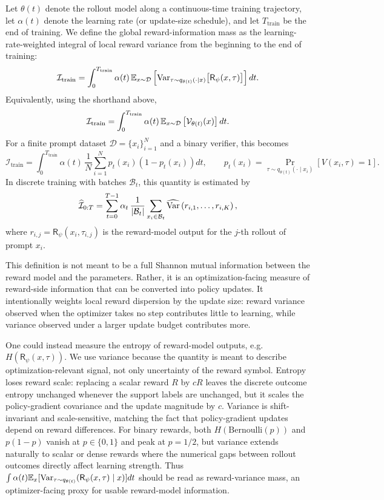 Let $\theta(t)$ denote the rollout model along a continuous-time training trajectory, let $\alpha(t)$ denote the learning rate (or update-size schedule), and let $T_{\mathrm{train}}$ be the end of training. We define the global reward-information mass as the learning-rate-weighted integral of local reward variance from the beginning to the end of training:
\[
  \mathcal{I}_{\mathrm{train}}
  =
  \int_0^{T_{\mathrm{train}}}
  \alpha(t)\,
  \mathbb{E}_{x\sim \mathcal{D}}
  \left[
    \mathrm{Var}_{\tau\sim q_{\theta(t)}(\cdot\mid x)}
    \big[
      \mathsf{R}_\psi(x,\tau)
    \big]
  \right]
  dt.
\]
Equivalently, using the shorthand above,
\[
  \mathcal{I}_{\mathrm{train}}
  =
  \int_0^{T_{\mathrm{train}}}
  \alpha(t)\,
  \mathbb{E}_{x\sim \mathcal{D}}
  \left[
    \mathcal{V}_{\theta(t)}(x)
  \right]
  dt.
\]
For a finite prompt dataset $\mathcal{D}=\{x_i\}_{i=1}^N$ and a binary verifier, this becomes
\[
  \mathcal{I}_{\mathrm{train}}
  =
  \int_0^{T_{\mathrm{train}}}
  \alpha(t)\,
  \frac{1}{N}\sum_{i=1}^N
  p_t(x_i)(1-p_t(x_i))
  dt,
  \qquad
  p_t(x_i)=\Pr_{\tau\sim q_{\theta(t)}(\cdot\mid x_i)}[V(x_i,\tau)=1].
\]
In discrete training with batches $\mathcal{B}_t$, this quantity is estimated by
\[
  \widehat{\mathcal{I}}_{0:T}
  =
  \sum_{t=0}^{T-1}
  \alpha_t\,
  \frac{1}{|\mathcal{B}_t|}
  \sum_{x_i\in \mathcal{B}_t}
  \widehat{\mathrm{Var}}\left(
    r_{i,1},\ldots,r_{i,K}
  \right),
\]
where $r_{i,j}=\mathsf{R}_\psi(x_i,\tau_{i,j})$ is the reward-model output for the $j$-th rollout of prompt $x_i$.

This definition is not meant to be a full Shannon mutual information between the reward model and the parameters. Rather, it is an optimization-facing measure of reward-side information that can be converted into policy updates. It intentionally weights local reward dispersion by the update size: reward variance observed when the optimizer takes no step contributes little to learning, while variance observed under a larger update budget contributes more.

\begin{discussionbox}[title={Discussion: Why variance rather than entropy?}]
One could instead measure the entropy of reward-model outputs, e.g. $H(\mathsf{R}_\psi(x,\tau))$. We use variance because the quantity is meant to describe optimization-relevant signal, not only uncertainty of the reward symbol. Entropy loses reward scale: replacing a scalar reward $R$ by $cR$ leaves the discrete outcome entropy unchanged whenever the support labels are unchanged, but it scales the policy-gradient covariance and the update magnitude by $c$. Variance is shift-invariant and scale-sensitive, matching the fact that policy-gradient updates depend on reward differences. For binary rewards, both $H(\mathrm{Bernoulli}(p))$ and $p(1-p)$ vanish at $p\in\{0,1\}$ and peak at $p=1/2$, but variance extends naturally to scalar or dense rewards where the numerical gaps between rollout outcomes directly affect learning strength. Thus $\int \alpha(t)\mathbb{E}_x[\mathrm{Var}_{\tau\sim q_{\theta(t)}}(\mathsf{R}_\psi(x,\tau)\mid x)]dt$ should be read as reward-variance mass, an optimizer-facing proxy for usable reward-model information.
\end{discussionbox}

